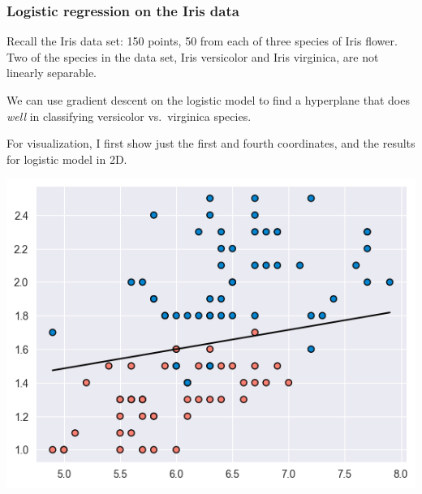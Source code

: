 \documentclass[smaller]{beamer}
\theoremstyle{example}
\begin{document}
\begin{frame}
    \frametitle{Logistic regression on the Iris data}
    Recall the Iris data set: 150 points, 50 from each of three species of Iris flower. Two of the species in the data set, Iris versicolor and Iris virginica, are not linearly separable.

    \pause
    We can use gradient descent on the logistic model to find a hyperplane that does \textit{well} in classifying versicolor vs.\ virginica species.

    \pause
    For visualization, I first show just the first and fourth coordinates, and the results for logistic model in 2D.
    
    \vfill

    \centering
    \includegraphics[height=0.35\textheight]{../../Images/HalfSp_2DIrisData.png}
\end{frame}
\end{document}
